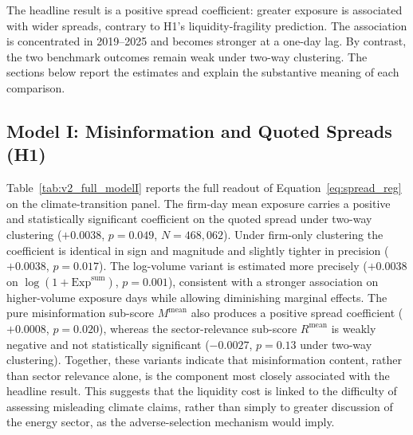 \documentclass{article}
\theoremstyle{plain}
\begin{document}
The headline result is a positive spread coefficient: greater exposure is associated with wider spreads, contrary to H1's liquidity-fragility prediction. The association is concentrated in 2019--2025 and becomes stronger at a one-day lag. By contrast, the two benchmark outcomes remain weak under two-way clustering. The sections below report the estimates and explain the substantive meaning of each comparison.



\subsection{Model I: Misinformation and Quoted Spreads (H1)}
\label{sec:results_modelI}

Table~\ref{tab:v2_full_modelI} reports the full readout of Equation~\ref{eq:spread_reg} on the climate-transition panel. The firm-day mean exposure carries a positive and statistically significant coefficient on the quoted spread under two-way clustering ($+0.0038$, $p=0.049$, $N=468{,}062$). Under firm-only clustering the coefficient is identical in sign and magnitude and slightly tighter in precision ($+0.0038$, $p=0.017$). The log-volume variant is estimated more precisely ($+0.0038$ on $\log(1+\mathrm{Exp}^{\text{sum}})$, $p=0.001$), consistent with a stronger association on higher-volume exposure days while allowing diminishing marginal effects. The pure misinformation sub-score $M^{\text{mean}}$ also produces a positive spread coefficient ($+0.0008$, $p=0.020$), whereas the sector-relevance sub-score $R^{\text{mean}}$ is weakly negative and not statistically significant ($-0.0027$, $p=0.13$ under two-way clustering). Together, these variants indicate that misinformation content, rather than sector relevance alone, is the component most closely associated with the headline result. This suggests that the liquidity cost is linked to the difficulty of assessing misleading climate claims, rather than simply to greater discussion of the energy sector, as the adverse-selection mechanism would imply.


\end{document}
